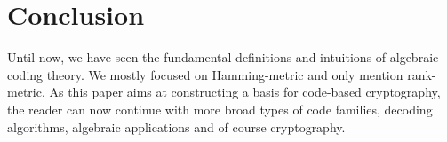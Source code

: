 \section{Conclusion}
Until now, we have seen the fundamental definitions and intuitions of algebraic coding theory. We mostly focused on Hamming-metric and only mention rank-metric. As this paper aims at constructing a basis for code-based cryptography, the reader can now continue with more broad types of code families, decoding algorithms, algebraic applications and of course cryptography.